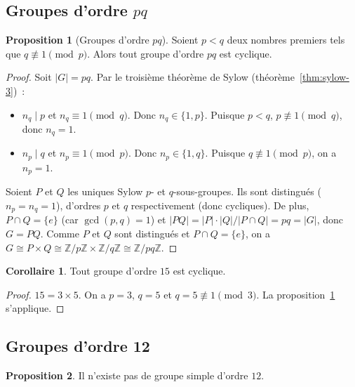 \documentclass[12pt,a4paper,openany]{book}
\theoremstyle{definition}
\newtheorem{proposition}{Proposition}[chapter]
\newtheorem{corollaire}{Corollaire}[chapter]
\newcommand{\Z}{\mathbb{Z}}
\begin{document}
\subsection{Groupes d'ordre $pq$}\label{subsec:ordre-pq}

\begin{proposition}[Groupes d'ordre $pq$]\label{prop:ordre-pq}
  Soient $p<q$ deux nombres premiers tels que $q\not\equiv 1\pmod{p}$.
  Alors tout groupe d'ordre $pq$ est cyclique.
\end{proposition}

\begin{proof}
  Soit $|G|=pq$. Par le troisième théorème de Sylow
  (théorème~\ref{thm:sylow-3})~:
  \begin{itemize}
    \item $n_q\mid p$ et $n_q\equiv 1\pmod{q}$. Donc $n_q\in\{1,p\}$.
      Puisque $p<q$, $p\not\equiv 1\pmod{q}$, donc $n_q=1$.
    \item $n_p\mid q$ et $n_p\equiv 1\pmod{p}$. Donc $n_p\in\{1,q\}$.
      Puisque $q\not\equiv 1\pmod{p}$, on a $n_p=1$.
  \end{itemize}
  Soient $P$ et $Q$ les uniques Sylow $p$- et $q$-sous-groupes. Ils
  sont distingués ($n_p=n_q=1$), d'ordres $p$ et $q$ respectivement
  (donc cycliques). De plus, $P\cap Q=\{e\}$ (car $\gcd(p,q)=1$)
  et $|PQ| = |P|\cdot|Q|/|P\cap Q| = pq = |G|$, donc $G=PQ$.
  Comme $P$ et $Q$ sont distingués et $P\cap Q=\{e\}$, on a
  $G\cong P\times Q\cong\Z/p\Z\times\Z/q\Z\cong\Z/pq\Z$.
\end{proof}

\begin{corollaire}\label{cor:ordre-15}
  Tout groupe d'ordre $15$ est cyclique.
\end{corollaire}

\begin{proof}
  $15=3\times 5$. On a $p=3$, $q=5$ et $q=5\not\equiv 1\pmod{3}$. La
  proposition~\ref{prop:ordre-pq} s'applique.
\end{proof}

\subsection{Groupes d'ordre 12}\label{subsec:ordre-12}

\begin{proposition}\label{prop:pas-simple-12}
  Il n'existe pas de groupe simple d'ordre $12$.
\end{proposition}
\end{document}
